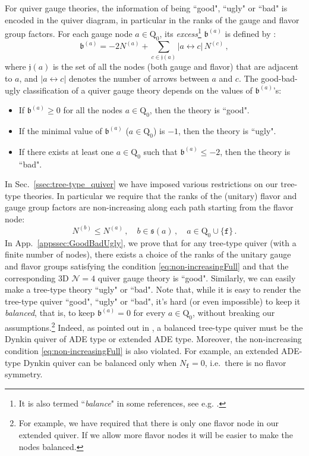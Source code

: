 \documentclass[12pt,a4paper]{article}
\renewcommand{\(}{\left(}
\renewcommand{\)}{\right)}
\renewcommand{\(}{\left(}
\renewcommand{\)}{\right)}
\begin{document}
For quiver gauge theories, the information of being ``good", ``ugly" or ``bad" is encoded in the quiver diagram, in particular in the ranks of the gauge and flavor group factors.  
For each gauge node $a\in\textrm{Q}_0$, its \textit{excess}\footnote{It is also termed ``\textit{balance}" in some references, see e.g. \cite{Hanany_2024}.} $\mathfrak{b}^{(a)}$ is defined by \cite{Gaiotto_2009}: 
\begin{equation}\label{eq:excess}
\mathfrak{b}^{(a)}=-2N^{(a)}+\sum_{c\in \mathfrak{j}(a)}|a\leftrightarrow c|  \, N^{(c)}\,,
\end{equation}
where $\mathfrak{j}(a)$ is the set of all the nodes (both gauge and flavor) that are adjacent to $a$, and $|a\leftrightarrow c|$ denotes the number of arrows between $a$ and $c$. 
The good-bad-ugly classification of a quiver gauge theory depends on the values of $\mathfrak{b}^{(a)}$'s:
\begin{itemize}
\item If $\mathfrak{b}^{(a)}\geq 0$ for all the nodes $a\in \mathrm{Q}_0$, then the theory is ``good".


\item If the minimal value of $\mathfrak{b}^{(a)}$ ($a\in \textrm{Q}_0$) is $-1$, then the theory is ``ugly".

\item If there exists at least one $a\in \textrm{Q}_0$ such that $\mathfrak{b}^{(a)}\leq -2$, then the theory is ``bad".
\end{itemize}

In Sec.~\ref{ssec:tree-type_quiver} we have imposed various restrictions on our tree-type theories. 
In particular we require that the ranks of the (unitary) flavor and gauge group factors are non-increasing along each path starting from the flavor node:
\begin{equation}\label{eq:non-increasingFull}
N^{(b)}\leq N^{(a)}\,,\quad b\in \mathfrak{s}(a)\,,\quad a\in \textrm{Q}_0\cup\{\mathtt{f}\}\,.
\end{equation}
In App.~\ref{appssec:GoodBadUgly}, we prove that for any tree-type quiver (with a finite number of  nodes), there exists a choice of the ranks of the unitary gauge and flavor groups satisfying the condition \eqref{eq:non-increasingFull} and that the corresponding 3D $\mathcal{N}=4$ quiver gauge theory is ``good".
Similarly, we can easily make a tree-type theory ``ugly" or ``bad". 
Note that, while it is easy to render the tree-type quiver ``good", ``ugly" or ``bad", it's hard (or even impossible) to keep it \textit{balanced}, that is, to keep $\mathfrak{b}^{(a)}=0$ for every $a\in\textrm{Q}_0$, without breaking our assumptions.\footnote{For example, we have required that there is only one flavor node in our extended quiver. If we allow more flavor nodes it will be easier to make the nodes balanced.} 
Indeed, as pointed out in \cite{Gaiotto_2009}, a balanced tree-type quiver must be the Dynkin quiver of ADE type or extended ADE type. 
Moreover, the non-increasing condition \eqref{eq:non-increasingFull} is also violated. 
For example, an extended ADE-type Dynkin quiver can be balanced only when $N_{\mathtt{f}}=0$, i.e.\ there is no flavor symmetry.
\end{document}
